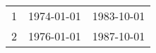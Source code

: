 % 
\begin{tabular}{ccc}
  \hline
  \hline
1 & 1974-01-01 & 1983-10-01 \\ 
  2 & 1976-01-01 & 1987-10-01 \\ 
   \hline
\end{tabular}
